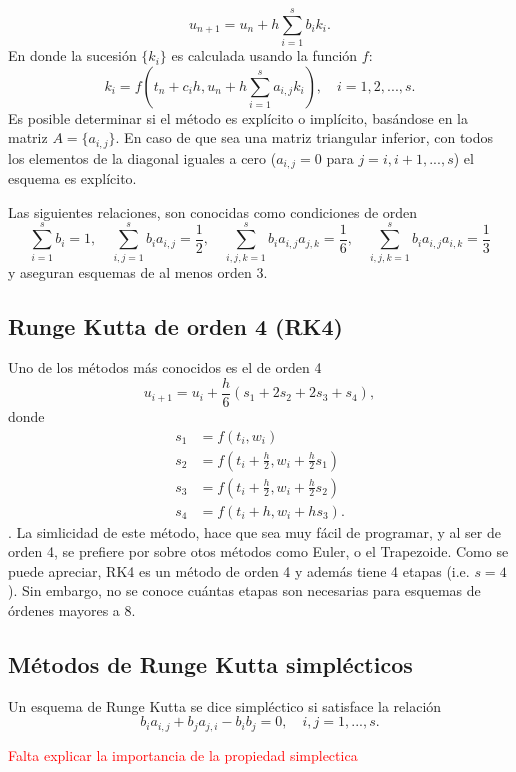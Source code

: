 \begin{equation}
    u_{n+1} = u_n + h\sum_{i=1}^sb_ik_i.
\end{equation}
En donde la sucesión $\{k_i\}$ es calculada usando la función $f$:
\begin{equation}
    k_i = f\left(t_n + c_ih, u_n + h\sum_{i=1}^sa_{i,j}k_i\right), \quad i = 1, 2, ..., s.
\end{equation}
Es posible determinar si el método es explícito o implícito, basándose en la matriz $A = \{a_{i,j}\}$. En caso de que sea una matriz triangular inferior, con todos los elementos de la diagonal iguales a cero ($a_{i,j} = 0$ para $j = i, i+1, ...,s$) el esquema es explícito.


Las siguientes relaciones, son conocidas como condiciones de orden
\begin{equation}
    \sum_{i=1}^s b_i=1, \quad \sum_{i,j=1}^sb_ia_{i,j}=\frac{1}{2}, \quad \sum_{i,j,k=1}^sb_i a_{i,j} a_{j,k}=\frac{1}{6}, \quad  \sum_{i,j,k=1}^sb_ia_{i,j}a_{i,k}=\frac{1}{3}
\end{equation}
y aseguran esquemas de al menos orden 3.

\subsection{Runge Kutta de orden 4 (RK4)}
Uno de los métodos más conocidos es el de orden 4
\begin{equation}
    u_{i+1} = u_i + \frac{h}{6}(s_1 + 2s_2 + 2s_3 + s_4),
\end{equation}
donde 
\begin{align*}
    s_1 &= f(t_i, w_i) \\
    s_2 &= f\left(t_i +\frac{h}{2}, w_i+\frac{h}{2}s_1\right)\\
    s_3 &= f\left(t_i +\frac{h}{2}, w_i+\frac{h}{2}s_2\right)\\
    s_4 &= f\left(t_i + h, w_i+hs_3\right).
\end{align*}.
La simlicidad de este método, hace que sea muy fácil de programar, y al ser de orden 4, se prefiere por sobre otos métodos como Euler, o el Trapezoide. Como se puede apreciar, RK4 es un método de orden 4 y además tiene 4 etapas (i.e. $s=4$). Sin embargo, no se conoce cuántas etapas son necesarias para esquemas de órdenes mayores a 8. 
\subsection{Métodos de Runge Kutta simplécticos}
\begin{definition}
    Un esquema de Runge Kutta se dice simpléctico si satisface la relación 
    \begin{equation}
        b_ia_{i,j} + b_ja_{j,i} - b_ib_j = 0, \quad i,j=1, ..., s.
    \end{equation}
\end{definition}
\textcolor{red}{Falta explicar la importancia de la propiedad simplectica}
